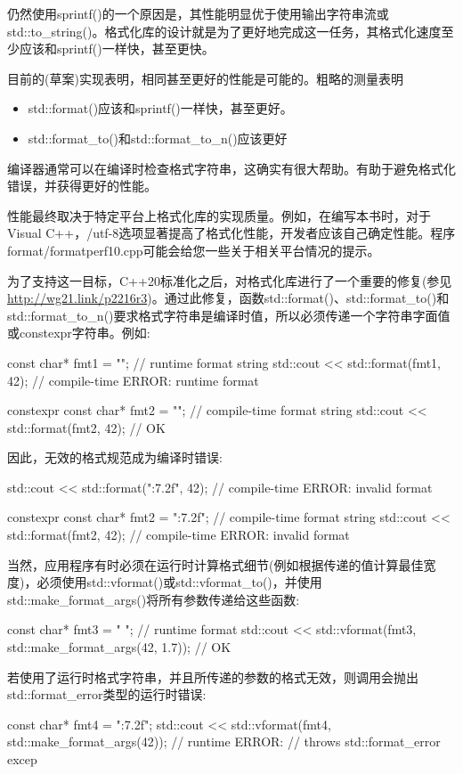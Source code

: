 
仍然使用sprintf()的一个原因是，其性能明显优于使用输出字符串流或std::to\_string()。格式化库的设计就是为了更好地完成这一任务，其格式化速度至少应该和sprintf()一样快，甚至更快。

目前的(草案)实现表明，相同甚至更好的性能是可能的。粗略的测量表明

\begin{itemize}
\item 
std::format()应该和sprintf()一样快，甚至更好。

\item 
std::format\_to()和std::format\_to\_n()应该更好
\end{itemize}

编译器通常可以在编译时检查格式字符串，这确实有很大帮助。有助于避免格式化错误，并获得更好的性能。

性能最终取决于特定平台上格式化库的实现质量。例如，在编写本书时，对于Visual C++，/utf-8选项显著提高了格式化性能，开发者应该自己确定性能。程序format/formatperf10.cpp可能会给您一些关于相关平台情况的提示。


为了支持这一目标，C++20标准化之后，对格式化库进行了一个重要的修复(参见\url{http://wg21.link/p2216r3})。通过此修复，函数std::format()、std::format\_to()和std::format\_to\_n()要求格式字符串是编译时值，所以必须传递一个字符串字面值或constexpr字符串。例如:

\begin{cpp}
const char* fmt1 = "{}\n"; // runtime format string
std::cout << std::format(fmt1, 42); // compile-time ERROR: runtime format

constexpr const char* fmt2 = "{}\n"; // compile-time format string
std::cout << std::format(fmt2, 42); // OK
\end{cpp}

因此，无效的格式规范成为编译时错误:

\begin{cpp}
std::cout << std::format("{:7.2f}\n", 42); // compile-time ERROR: invalid format

constexpr const char* fmt2 = "{:7.2f}\n"; // compile-time format string
std::cout << std::format(fmt2, 42); // compile-time ERROR: invalid format
\end{cpp}

当然，应用程序有时必须在运行时计算格式细节(例如根据传递的值计算最佳宽度)，必须使用std::vformat()或std::vformat\_to()，并使用std::make\_format\_args()将所有参数传递给这些函数:

\begin{cpp}
const char* fmt3 = "{} {}\n"; // runtime format
std::cout << std::vformat(fmt3, std::make_format_args(42, 1.7)); // OK
\end{cpp}

若使用了运行时格式字符串，并且所传递的参数的格式无效，则调用会抛出std::format\_error类型的运行时错误:

\begin{cpp}
const char* fmt4 = "{:7.2f}\n";
std::cout << std::vformat(fmt4, std::make_format_args(42)); // runtime ERROR:
// throws std::format_error excep
\end{cpp}


